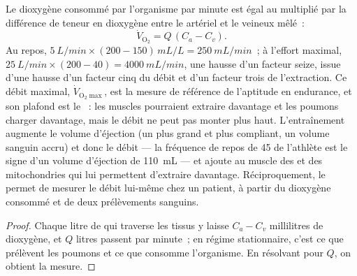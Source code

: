\begin{theorem}\label{thm:b2:blood-pressure:fick}
Le dioxygène consommé par l'organisme par minute est égal au  multiplié par la différence de teneur en dioxygène entre le
 artériel et le  veineux mêlé~:
\[
\dot V_{\mathrm{O_2}} = Q\,(C_a - C_v).
\]
Au repos, $\qty{5}{L/min}\times(200 - 150)\,\unit{mL/L} = \qty{250}{mL/min}$~;
à l'effort maximal, $\qty{25}{L/min}\times(200 - 40) =
\qty{4000}{mL/min}$, une hausse d'un facteur seize, issue d'une hausse
d'un facteur cinq du débit et d'un facteur trois de l'extraction. Ce
débit maximal,
$\dot V_{\mathrm{O_2}\max}$, est la mesure de référence de l'aptitude en
endurance, et son plafond est le ~: les muscles pourraient extraire
davantage et les poumons charger davantage, mais le débit ne peut pas
monter plus haut. L'entraînement augmente le volume d'éjection (un
 plus grand et plus compliant, un volume sanguin accru) et
donc le débit --- la fréquence de repos de 45 de l'athlète est le signe
d'un volume d'éjection de \qty{110}{mL} --- et ajoute au muscle des
 et des mitochondries qui lui permettent d'extraire
davantage. Réciproquement, le  permet de mesurer le débit
lui-même chez un patient, à partir du dioxygène consommé et de deux
prélèvements sanguins.
\end{theorem}
\begin{proof}
Chaque litre de  qui traverse les tissus y laisse $C_a - C_v$
millilitres de dioxygène, et $Q$ litres passent par minute~; en régime
stationnaire, c'est ce que prélèvent les poumons et ce que consomme
l'organisme. En résolvant pour $Q$, on obtient la mesure.
\end{proof}


